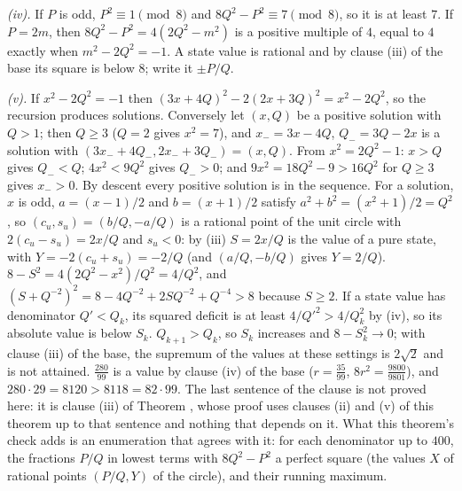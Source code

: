 \emph{(iv).} If $P$ is odd, $P^{2} \equiv 1 \pmod 8$ and $8Q^{2} - P^{2} \equiv 7 \pmod 8$, so it is at least $7$. If $P = 2m$, then $8Q^{2} - P^{2} = 4(2Q^{2} - m^{2})$ is a positive multiple of $4$, equal to $4$ exactly when $m^{2} - 2Q^{2} = -1$. A state value is rational and by clause (iii) of the base its square is below $8$; write it $\pm P/Q$.

\emph{(v).} If $x^{2} - 2Q^{2} = -1$ then $(3x + 4Q)^{2} - 2(2x + 3Q)^{2} = x^{2} - 2Q^{2}$, so the recursion produces solutions. Conversely let $(x, Q)$ be a positive solution with $Q > 1$; then $Q \ge 3$ ($Q = 2$ gives $x^{2} = 7$), and $x_{-} = 3x - 4Q$, $Q_{-} = 3Q - 2x$ is a solution with $(3x_{-} + 4Q_{-}, 2x_{-} + 3Q_{-}) = (x, Q)$. From $x^{2} = 2Q^{2} - 1$: $x > Q$ gives $Q_{-} < Q$; $4x^{2} < 9Q^{2}$ gives $Q_{-} > 0$; and $9x^{2} = 18Q^{2} - 9 > 16Q^{2}$ for $Q \ge 3$ gives $x_{-} > 0$. By descent every positive solution is in the sequence. For a solution, $x$ is odd, $a = (x - 1)/2$ and $b = (x + 1)/2$ satisfy $a^{2} + b^{2} = (x^{2} + 1)/2 = Q^{2}$, so $(c_{u}, s_{u}) = (b/Q, -a/Q)$ is a rational point of the unit circle with $2(c_{u} - s_{u}) = 2x/Q$ and $s_{u} < 0$: by (iii) $S = 2x/Q$ is the value of a pure state, with $Y = -2(c_{u} + s_{u}) = -2/Q$ (and $(a/Q, -b/Q)$ gives $Y = 2/Q$). $8 - S^{2} = 4(2Q^{2} - x^{2})/Q^{2} = 4/Q^{2}$, and $(S + Q^{-2})^{2} = 8 - 4Q^{-2} + 2SQ^{-2} + Q^{-4} > 8$ because $S \ge 2$. If a state value has denominator $Q' < Q_{k}$, its squared deficit is at least $4/Q'^{2} > 4/Q_{k}^{2}$ by (iv), so its absolute value is below $S_{k}$. $Q_{k+1} > Q_{k}$, so $S_{k}$ increases and $8 - S_{k}^{2} \to 0$; with clause (iii) of the base, the supremum of the values at these settings is $2\sqrt{2}$ and is not attained. $\tfrac{280}{99}$ is a value by clause (iv) of the base ($r = \tfrac{35}{99}$, $8r^{2} = \tfrac{9800}{9801}$), and $280 \cdot 29 = 8120 > 8118 = 82 \cdot 99$. The last sentence of the clause is not proved here: it is clause (iii) of Theorem , whose proof uses clauses (ii) and (v) of this theorem up to that sentence and nothing that depends on it. What this theorem's check adds is an enumeration that agrees with it: for each denominator up to $400$, the fractions $P/Q$ in lowest terms with $8Q^{2} - P^{2}$ a perfect square (the values $X$ of rational points $(P/Q, Y)$ of the circle), and their running maximum.
